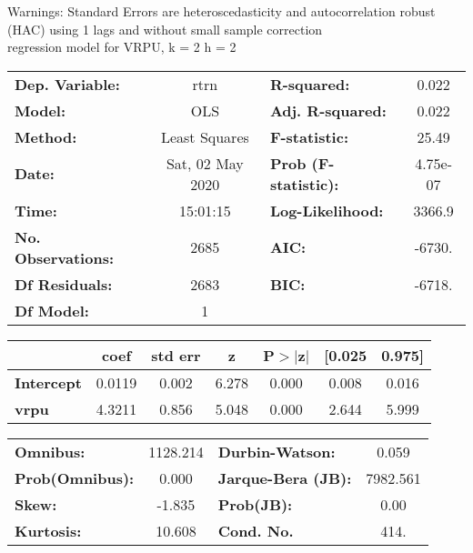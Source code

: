 Warnings: \newline
 [1] Standard Errors are heteroscedasticity and autocorrelation robust (HAC) using 1 lags and without small sample correction\\ 

regression model for VRPU, k = 2 h = 2\begin{center}
\begin{tabular}{lclc}
\toprule
\textbf{Dep. Variable:}    &       rtrn       & \textbf{  R-squared:         } &     0.022   \\
\textbf{Model:}            &       OLS        & \textbf{  Adj. R-squared:    } &     0.022   \\
\textbf{Method:}           &  Least Squares   & \textbf{  F-statistic:       } &     25.49   \\
\textbf{Date:}             & Sat, 02 May 2020 & \textbf{  Prob (F-statistic):} &  4.75e-07   \\
\textbf{Time:}             &     15:01:15     & \textbf{  Log-Likelihood:    } &    3366.9   \\
\textbf{No. Observations:} &        2685      & \textbf{  AIC:               } &    -6730.   \\
\textbf{Df Residuals:}     &        2683      & \textbf{  BIC:               } &    -6718.   \\
\textbf{Df Model:}         &           1      & \textbf{                     } &             \\
\bottomrule
\end{tabular}
\begin{tabular}{lcccccc}
                   & \textbf{coef} & \textbf{std err} & \textbf{z} & \textbf{P$> |$z$|$} & \textbf{[0.025} & \textbf{0.975]}  \\
\midrule
\textbf{Intercept} &       0.0119  &        0.002     &     6.278  &         0.000        &        0.008    &        0.016     \\
\textbf{vrpu}      &       4.3211  &        0.856     &     5.048  &         0.000        &        2.644    &        5.999     \\
\bottomrule
\end{tabular}
\begin{tabular}{lclc}
\textbf{Omnibus:}       & 1128.214 & \textbf{  Durbin-Watson:     } &    0.059  \\
\textbf{Prob(Omnibus):} &   0.000  & \textbf{  Jarque-Bera (JB):  } & 7982.561  \\
\textbf{Skew:}          &  -1.835  & \textbf{  Prob(JB):          } &     0.00  \\
\textbf{Kurtosis:}      &  10.608  & \textbf{  Cond. No.          } &     414.  \\
\bottomrule
\end{tabular}
\end{center}


